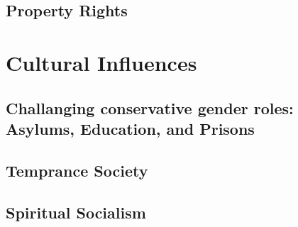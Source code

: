 \documentclass{article}
\begin{document}
\subsection{Property Rights}

\section{Cultural Influences}
\subsection{Challanging conservative gender roles: Asylums, Education, and Prisons}
\subsection{Temprance Society}
\subsection{Spiritual Socialism}

\newpage
\printbibliography
\end{document}
